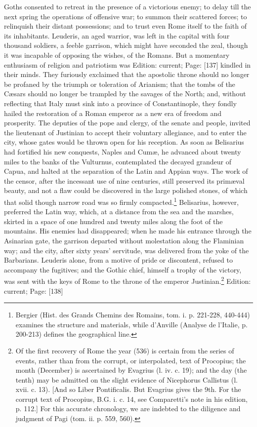 Goths consented to retreat in the presence of a victorious enemy; to delay till the next spring the operations of offensive war; to summon their scattered forces; to relinquish their distant possessions; and to trust even Rome itself to the faith of its inhabitants. Leuderis, an aged warrior, was left in the capital with four thousand soldiers, a feeble garrison, which might have seconded the zeal, though it was incapable of opposing the wishes, of the Romans. But a momentary enthusiasm of religion and patriotism was Edition: current; Page: [137] kindled in their minds. They furiously exclaimed that the apostolic throne should no longer be profaned by the triumph or toleration of Arianism; that the tombs of the Cæsars should no longer be trampled by the savages of the North; and, without reflecting that Italy must sink into a province of Constantinople, they fondly hailed the restoration of a Roman emperor as a new era of freedom and prosperity. The deputies of the pope and clergy, of the senate and people, invited the lieutenant of Justinian to accept their voluntary allegiance, and to enter the city, whose gates would be thrown open for his reception. As soon as Belisarius had fortified his new conquests, Naples and Cumæ, he advanced about twenty miles to the banks of the Vulturnus, contemplated the decayed grandeur of Capua, and halted at the separation of the Latin and Appian ways. The work of the censor, after the incessant use of nine centuries, still preserved its primæval beauty, and not a flaw could be discovered in the large polished stones, of which that solid though narrow road was so firmly compacted.\footnote{Bergier (Hist. des Grands Chemins des Romains, tom. i. p. 221-228, 440-444) examines the structure and materials, while d\texthebrew{}’Anville (Analyse de l\texthebrew{}’Italie, p. 200-213) defines the geographical line.} Belisarius, however, preferred the Latin way, which, at a distance from the sea and the marshes, skirted in a space of one hundred and twenty miles along the foot of the mountains. His enemies had disappeared; when he made his entrance through the Asinarian gate, the garrison departed without molestation along the Flaminian way; and the city, after sixty years\texthebrew{}’ servitude, was delivered from the yoke of the Barbarians. Leuderis alone, from a motive of pride or discontent, refused to accompany the fugitives; and the Gothic chief, himself a trophy of the victory, was sent with the keys of Rome to the throne of the emperor Justinian.\footnote{Of the first recovery of Rome the year (536) is certain from the series of events, rather than from the corrupt, or interpolated, text of Procopius; the month (December) is ascertained by Evagrius (l. iv. c. 19); and the day (the tenth) may be admitted on the slight evidence of Nicephorus Callistus (l. xvii. c. 13). [And so Liber Pontificalis. But Evagrius gives the 9th. For the corrupt text of Procopius, B.G. i. c. 14, see Comparetti\texthebrew{}’s note in his edition, p. 112.] For this accurate chronology, we are indebted to the diligence and judgment of Pagi (tom. ii. p. 559, 560).}
Edition: current; Page: [138]

